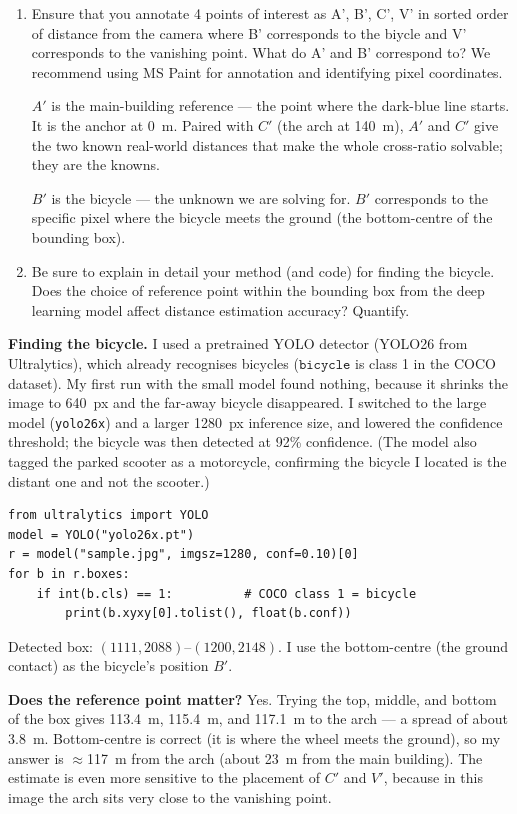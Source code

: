 \begin{enumerate}
\item Ensure that you annotate 4 points of interest as A', B', C', V'  in sorted order of distance from the camera where B' corresponds to the biycle and V' corresponds to the vanishing point.  What do A' and B' correspond to?
We recommend using MS Paint for annotation and identifying pixel coordinates.
\begin{studentSpace}
    \textbf{$A'$} is the main-building reference --- the point where the
    dark-blue line starts. It is the anchor at 0~m. Paired with $C'$ (the
    arch at 140~m), $A'$ and $C'$ give the two known real-world distances
    that make the whole cross-ratio solvable; they are the knowns.

    \textbf{$B'$} is the bicycle --- the unknown we are solving for. $B'$
    corresponds to the specific pixel where the bicycle meets the ground
    (the bottom-centre of the bounding box).
\end{studentSpace}

\item Be sure to  explain in detail your method (and code) for finding the bicycle. Does the choice of reference point within the bounding box from the deep learning model affect distance estimation accuracy? Quantify.
\end{enumerate}
\begin{studentSpace}

    \textbf{Finding the bicycle.}
    I used a pretrained YOLO detector (YOLO26 from Ultralytics), which
    already recognises bicycles ($\texttt{bicycle}$ is class 1 in the COCO
    dataset). My first run with the small model found nothing, because it
    shrinks the image to 640~px and the far-away bicycle disappeared. I
    switched to the large model (\texttt{yolo26x}) and a larger 1280~px
    inference size, and lowered the confidence threshold; the bicycle was
    then detected at 92\% confidence. (The model also tagged the parked
    scooter as a motorcycle, confirming the bicycle I located is the
    distant one and not the scooter.)

\begin{verbatim}
from ultralytics import YOLO
model = YOLO("yolo26x.pt")
r = model("sample.jpg", imgsz=1280, conf=0.10)[0]
for b in r.boxes:
    if int(b.cls) == 1:          # COCO class 1 = bicycle
        print(b.xyxy[0].tolist(), float(b.conf))
\end{verbatim}

    Detected box: $(1111, 2088)$--$(1200, 2148)$. I use the bottom-centre
    (the ground contact) as the bicycle's position $B'$.

    \textbf{Does the reference point matter?}
    Yes. Trying the top, middle, and bottom of the box gives 113.4~m,
    115.4~m, and 117.1~m to the arch --- a spread of about 3.8~m.
    Bottom-centre is correct (it is where the wheel meets the ground), so
    my answer is $\approx$117~m from the arch (about 23~m from the main
    building). The estimate is even more sensitive to the placement of
    $C'$ and $V'$, because in this image the arch sits very close to the
    vanishing point.
\end{studentSpace}


